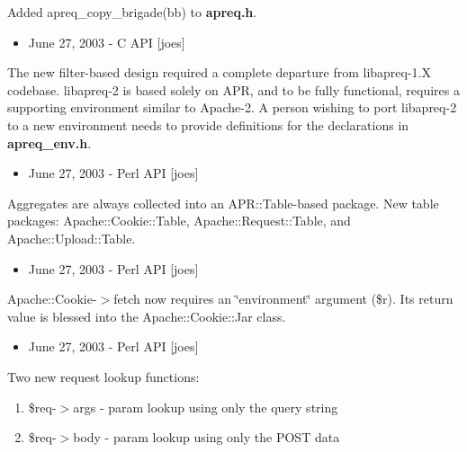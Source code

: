 Added apreq\_\-copy\_\-brigade(bb) to {\bf apreq.h}.

\begin{itemize}
\item June 27, 2003 - C API [joes]\end{itemize}


The new filter-based design required a complete departure from libapreq-1.X codebase. libapreq-2 is based solely on APR, and to be fully functional, requires a supporting environment similar to Apache-2. A person wishing to port libapreq-2 to a new environment needs to provide definitions for the declarations in {\bf apreq\_\-env.h}.

\begin{itemize}
\item June 27, 2003 - Perl API [joes]\end{itemize}


Aggregates are always collected into an APR::Table-based package. New table packages: Apache::Cookie::Table, Apache::Request::Table, and Apache::Upload::Table.

\begin{itemize}
\item June 27, 2003 - Perl API [joes]\end{itemize}


Apache::Cookie-$>$fetch now requires an \char`\"{}environment\char`\"{} argument (\$r). Its return value is blessed into the Apache::Cookie::Jar class.

\begin{itemize}
\item June 27, 2003 - Perl API [joes]\end{itemize}


Two new request lookup functions:\begin{enumerate}
\item \$req-$>$args - param lookup using only the query string\item \$req-$>$body - param lookup using only the POST data\end{enumerate}
